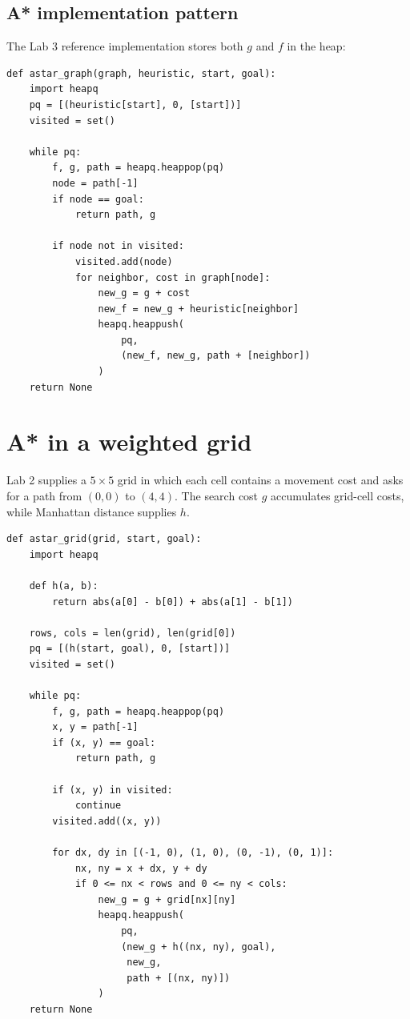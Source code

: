 \subsection{A* implementation pattern}

The Lab 3 reference implementation stores both \(g\) and \(f\) in the heap:

\begin{lstlisting}[style=mlpython]
def astar_graph(graph, heuristic, start, goal):
    import heapq
    pq = [(heuristic[start], 0, [start])]
    visited = set()

    while pq:
        f, g, path = heapq.heappop(pq)
        node = path[-1]
        if node == goal:
            return path, g

        if node not in visited:
            visited.add(node)
            for neighbor, cost in graph[node]:
                new_g = g + cost
                new_f = new_g + heuristic[neighbor]
                heapq.heappush(
                    pq,
                    (new_f, new_g, path + [neighbor])
                )
    return None
\end{lstlisting}

\section{A* in a weighted grid}

Lab 2 supplies a \(5\times5\) grid in which each cell contains a movement cost and asks for a path from \((0,0)\) to \((4,4)\). The search cost \(g\) accumulates grid-cell costs, while Manhattan distance supplies \(h\).

\begin{lstlisting}[style=mlpython]
def astar_grid(grid, start, goal):
    import heapq

    def h(a, b):
        return abs(a[0] - b[0]) + abs(a[1] - b[1])

    rows, cols = len(grid), len(grid[0])
    pq = [(h(start, goal), 0, [start])]
    visited = set()

    while pq:
        f, g, path = heapq.heappop(pq)
        x, y = path[-1]
        if (x, y) == goal:
            return path, g

        if (x, y) in visited:
            continue
        visited.add((x, y))

        for dx, dy in [(-1, 0), (1, 0), (0, -1), (0, 1)]:
            nx, ny = x + dx, y + dy
            if 0 <= nx < rows and 0 <= ny < cols:
                new_g = g + grid[nx][ny]
                heapq.heappush(
                    pq,
                    (new_g + h((nx, ny), goal),
                     new_g,
                     path + [(nx, ny)])
                )
    return None
\end{lstlisting}


